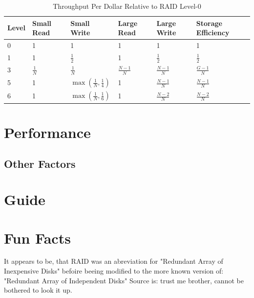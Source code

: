 \documentclass{article}
\begin{document}
\begin{table}[h]
    \begin{tabularx}{\textwidth}{l|X|X|X|X|X}
        \textbf{Level} &
        Small Read &
        Small Write &
        Large Read &
        Large Write &
        Storage Efficiency \\
        \hline
        0 & 1 & 1 & 1 & 1 & 1 \\
        1 & 1 & \( \frac{1}{2} \) & 1 & \( \frac{1}{2} \) & \( \frac{1}{2} \) \\
        3 & \( \frac{1}{N} \) & \( \frac{1}{N} \) & \( \frac{N-1}{N} \) & \( \frac{N-1}{N} \) & \( \frac{G-1}{N} \) \\
        5 & 1 & \( \max\left(\frac{1}{N},\frac{1}{4}\right) \) & 1 & \( \frac{N-1}{N} \) & \( \frac{N-1}{N} \) \\
        6 & 1 & \( \max\left(\frac{1}{N},\frac{1}{6}\right) \) & 1 & \( \frac{N-2}{N} \) & \( \frac{N-2}{N} \) \\
    \end{tabularx}
    \caption{Throughput Per Dollar Relative to RAID Level-0 \cite{cmu:raidhighperf}}
    \label{tab:economics}
\end{table}

\section{Performance}

\subsection{Other Factors}

\section{Guide}

\section*{Fun Facts}
It appears to be, that RAID was an abreviation for "Redundant Array of Inexpensive Disks" befoire beeing
modified to the more known version of: "Redundant Array of Independent Disks"
Source is: trust me brother, cannot be bothered to look it up.



\end{document}
